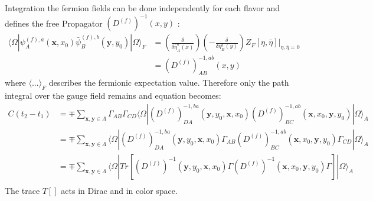         Integration the fermion fields can be done independently for each flavor and defines the free Propagator $(D^{(f)})^{-1}(x,y)$ \cite{qcd2_script_wagner}:
        \begin{equation}
            \begin{aligned}
                \langle\Omega|\psi^{(f),a}_A(\textbf{x}, x_0)\bar{\psi}^{(f),b}_B(\textbf{y}, y_0)|\Omega\rangle_F &= 
                (\frac{\delta}{\delta\bar{\eta}^a_A(x)})(-\frac{\delta}{\delta{\eta}^b_B(y)})Z_F[\eta,\bar{\eta}]\Big |_{\eta,\bar{\eta}=0}\\
                &= (D^{(f)})_{AB}^{-1,ab}(x,y)
            \end{aligned}
        \end{equation}
        where $\langle...\rangle_F$ describes the fermionic expectation value. Therefore only the path integral over the gauge field remains and equation  becomes:
        \begin{equation}\label{correlator_final}
            \begin{aligned}
                C(t_2 - t_1) &= \mp \sum_{\textbf{x},\textbf{y}\in\Lambda}\Gamma_{AB}\Gamma_{CD}
                \langle\Omega|(D^{(f)})_{DA}^{-1,ba}(\textbf{y},y_0,\textbf{x},x_0)
                (D^{(f)})_{BC}^{-1,ab}(\textbf{x},x_0,\textbf{y},y_0)|\Omega\rangle_A\\
                &= \mp \sum_{\textbf{x},\textbf{y}\in\Lambda}
                \langle\Omega|(D^{(f)})_{DA}^{-1,ba}(\textbf{y},y_0,\textbf{x},x_0)\Gamma_{AB}
                (D^{(f)})_{BC}^{-1,ab}(\textbf{x},x_0,\textbf{y},y_0)\Gamma_{CD}|\Omega\rangle_A\\
                &= \mp \sum_{\textbf{x},\textbf{y}\in\Lambda}
                \langle\Omega|Tr[(D^{(f)})^{-1}(\textbf{y},y_0,\textbf{x},x_0)\Gamma
                (D^{(f)})^{-1}(\textbf{x},x_0,\textbf{y},y_0)\Gamma]|\Omega\rangle_A\\
            \end{aligned}
        \end{equation}
        The trace $T[]$ acts in Dirac and in color space.